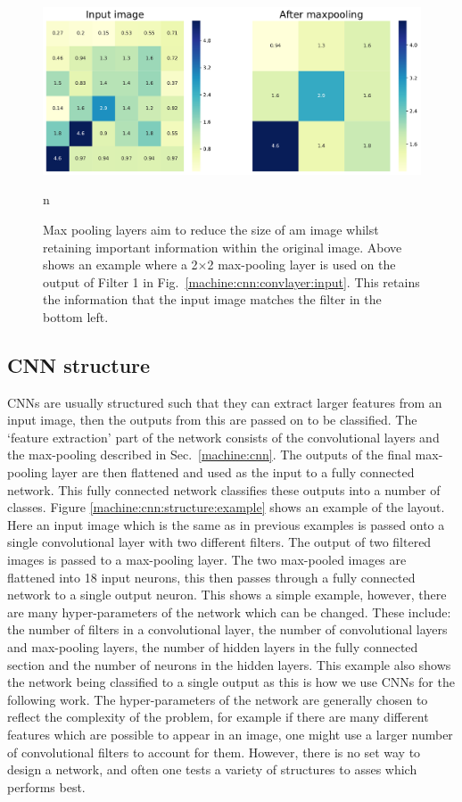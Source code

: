 \begin{figure}[h]
    \centering
    \includegraphics[width=\columnwidth]{C4_cnn/maxpool.pdf}
    \caption[How max pooling layers are applied in \glspl{CNN}.]{Max pooling layers aim to reduce the size of am image whilst retaining important information within the original image. Above shows an example where a 2$\times$2 max-pooling layer is used on the output of Filter 1 in Fig.~\ref{machine:cnn:convlayer:input}. This retains the information that the input image matches the filter in the bottom left.}n
    \label{machine:cnn:maxpool:image}
\end{figure}

\subsection{CNN structure}

\glspl{CNN} are usually structured such that they can extract larger features from an input image, then the outputs from this are passed on to be classified.
The `feature extraction' part of the network consists of the convolutional layers and the max-pooling described in Sec.~\ref{machine:cnn}.
The outputs of the final max-pooling layer are then flattened and used as the input to a fully connected network.
This fully connected network classifies these outputs into a number of classes.
Figure \ref{machine:cnn:structure:example} shows an example of the layout. 
Here an input image which is the same as in previous examples is passed onto a single convolutional layer with two different filters.
The output of two filtered images is passed to a max-pooling layer.
The two max-pooled images are flattened into 18 input neurons, this then passes through a fully connected network to a single output neuron.
This shows a simple example, however, there are many hyper-parameters of the network which can be changed.
These include: the number of filters in a convolutional layer, the number of convolutional layers and max-pooling layers, the number of hidden layers in the fully connected section and the number of neurons in the hidden layers. 
This example also shows the network being classified to a single output as this is how we use \glspl{CNN} for the following work.
The hyper-parameters of the network are generally chosen to reflect the complexity of the problem, for example if there are many different features which are possible to appear in an image, one might use a larger number of convolutional filters to account for them. However, there is no set way to design a network, and often one tests a variety of structures to asses which performs best.

